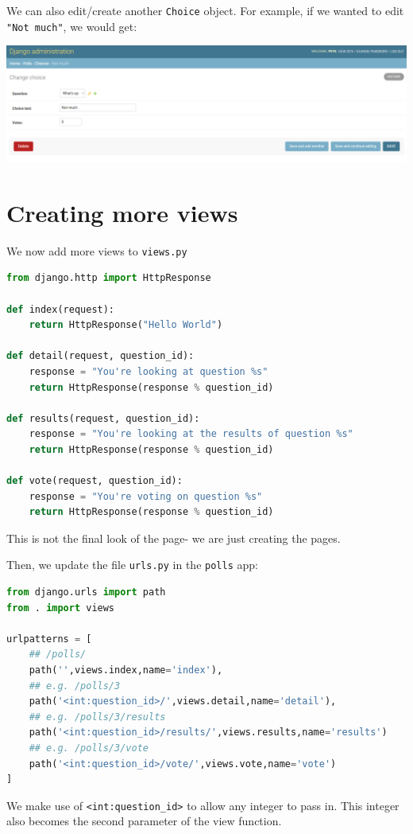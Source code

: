 \documentclass[a4paper, openany]{memoir}
\begin{document}
    We can also edit/create another \texttt{Choice} object. For example, if we wanted to edit \texttt{"Not much"}, we would get:
    \begin{center}
        \includegraphics[scale=0.3]{src/Django6.PNG}
    \end{center}
    \newpage

    \section{Creating more views}
    We now add more views to \texttt{views.py}
\begin{lstlisting}[language=python]
from django.http import HttpResponse

def index(request):
    return HttpResponse("Hello World")

def detail(request, question_id):
    response = "You're looking at question %s"
    return HttpResponse(response % question_id)

def results(request, question_id):
    response = "You're looking at the results of question %s"
    return HttpResponse(response % question_id)
    
def vote(request, question_id):
    response = "You're voting on question %s"
    return HttpResponse(response % question_id)
\end{lstlisting}
    This is not the final look of the page- we are just creating the pages.

    \noindent Then, we update the file \texttt{urls.py} in the \texttt{polls} app:
\begin{lstlisting}[language=python]
from django.urls import path
from . import views

urlpatterns = [
    ## /polls/
    path('',views.index,name='index'),
    ## e.g. /polls/3
    path('<int:question_id>/',views.detail,name='detail'),
    ## e.g. /polls/3/results
    path('<int:question_id>/results/',views.results,name='results')
    ## e.g. /polls/3/vote
    path('<int:question_id>/vote/',views.vote,name='vote')
]
\end{lstlisting}
    We make use of \texttt{<int:question\_id>} to allow any integer to pass in. This integer also becomes the second parameter of the view function.
\end{document}
